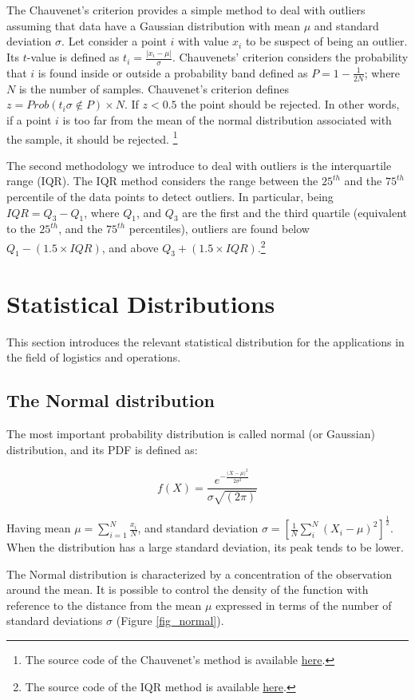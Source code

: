 The Chauvenet’s criterion provides a simple method to deal with outliers assuming that data have a Gaussian distribution with mean $\mu$ and standard deviation $\sigma$. Let consider a point $i$ with value $x_i$ to be suspect of being an outlier. Its $t$-value is defined as $t_i=\frac{|x_i-\mu|}{\sigma}$. Chauvenets’ criterion considers the probability that $i$ is found inside or outside a probability band defined as $P=1-\frac{1}{2N}$; where $N$ is the number of samples. Chauvenet’s criterion defines $z=Prob\left(t_i\sigma\notin P\right)\times N$. If $z<0.5$ the point should be rejected. In other words, if a point $i$ is too far from the mean of the normal distribution associated with the sample, it should be rejected. \footnote{The source code of the Chauvenet's method is available \href{https://github.com/aletuf93/logproj/blob/master/logproj/ml_dataCleaning.py}{here}.
} \par
The second methodology we introduce to deal with outliers is the interquartile range (IQR). The IQR method considers the range between the $25^{th}$ and the $75^{th}$ percentile of the data points to detect outliers. In particular, being $IQR = Q_3 - Q_1$, where $Q_1$, and $Q_3$ are the first and the third quartile (equivalent to the $25^{th}$, and the $75^{th}$ percentiles), outliers are found below $Q_1 - (1.5\times IQR)$, and above $Q_3 + (1.5\times IQR)$.\footnote{The source code of the IQR method is available \href{https://github.com/aletuf93/logproj/blob/master/logproj/ml_dataCleaning.py}{here}.
}


\section{Statistical Distributions}
This section introduces the relevant statistical distribution for the applications in the field of logistics and operations.

\subsection{The Normal distribution}
The most important probability distribution is called normal (or Gaussian) distribution, and its PDF is defined as:

\begin{equation}
f\left(X\right)=\frac{e^{-\frac{(X-{\mu)}^2}{2\sigma^2}}}{\sigma\sqrt{\left(2\pi\right)}}
\label{eq_pdfGaussian}
\end{equation}

Having mean $\mu=\sum_{i=1}^{N}\frac{x_i}{N}$, and standard deviation $\sigma=\left[\frac{1}{N}\sum_{i}^{N}\left(X_i-\mu\right)^2\right]^\frac{1}{2}$. When the distribution has a large standard deviation, its peak tends to be lower.\par
The Normal distribution is characterized by a concentration of the observation around the mean. It is possible to control the density of the function with reference to the distance from the mean $\mu$ expressed in terms of the number of standard deviations $\sigma$ (Figure \ref{fig_normal}).

